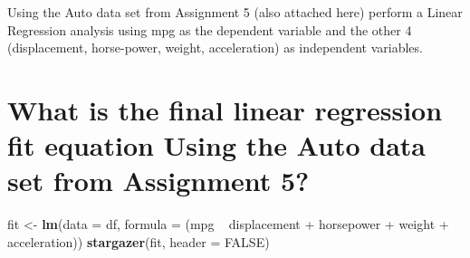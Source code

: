 \documentclass[]{article}
\newenvironment{Shaded}{\begin{snugshade}}{\end{snugshade}}
\newcommand{\KeywordTok}[1]{\textcolor[rgb]{0.13,0.29,0.53}{\textbf{{#1}}}}
\newcommand{\DataTypeTok}[1]{\textcolor[rgb]{0.13,0.29,0.53}{{#1}}}
\newcommand{\StringTok}[1]{\textcolor[rgb]{0.31,0.60,0.02}{{#1}}}
\newcommand{\OtherTok}[1]{\textcolor[rgb]{0.56,0.35,0.01}{{#1}}}
\newcommand{\NormalTok}[1]{{#1}}
\begin{document}
\newpage

Using the Auto data set from Assignment 5 (also attached here) perform a
Linear Regression analysis using mpg as the dependent variable and the
other 4 (displacement, horse-power, weight, acceleration) as independent
variables.

\section{What is the final linear regression fit equation Using the Auto
data set from Assignment
5?}\label{what-is-the-final-linear-regression-fit-equation-using-the-auto-data-set-from-assignment-5}

\begin{Shaded}
\end{Shaded}

\begin{Shaded}
\begin{Highlighting}[]
\NormalTok{fit <-}\StringTok{ }\KeywordTok{lm}\NormalTok{(}\DataTypeTok{data =} \NormalTok{df, }\DataTypeTok{formula =} \NormalTok{(mpg ~}\StringTok{ }\NormalTok{displacement +}\StringTok{  }\NormalTok{horsepower +}
\StringTok{                                  }\NormalTok{weight +}\StringTok{ }\NormalTok{acceleration))}
\KeywordTok{stargazer}\NormalTok{(fit, }\DataTypeTok{header =} \OtherTok{FALSE}\NormalTok{)}
\end{Highlighting}
\end{Shaded}
\end{document}
